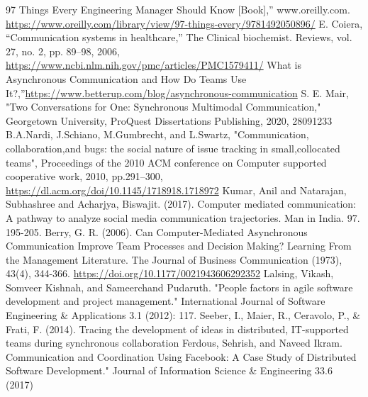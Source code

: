\documentclass[runningheads]{llncs}
\begin{document}
    \begin{thebibliography}{8}
        97 Things Every Engineering Manager Should Know [Book],” www.oreilly.com. \url{https://www.oreilly.com/library/view/97-things-every/9781492050896/}
        E. Coiera, “Communication systems in healthcare,” The Clinical biochemist. Reviews, vol. 27, no. 2, pp. 89–98, 2006, \url{https://www.ncbi.nlm.nih.gov/pmc/articles/PMC1579411/} 
        What is Asynchronous Communication and How Do Teams Use It?,”\url{https://www.betterup.com/blog/asynchronous-communication}
        S. E. Mair, "Two Conversations for One: Synchronous Multimodal Communication," Georgetown University, ProQuest Dissertations Publishing, 2020, 28091233
        B.A.Nardi, J.Schiano, M.Gumbrecht, and L.Swartz, "Communication, collaboration,and bugs: the social nature of issue tracking in small,collocated teams", Proceedings of the 2010 ACM conference on Computer supported cooperative work, 2010, pp.291–300, \url{https://dl.acm.org/doi/10.1145/1718918.1718972}
        Kumar, Anil and Natarajan, Subhashree and Acharjya, Biswajit. (2017). Computer mediated communication: A pathway to analyze social media communication trajectories. Man in India. 97. 195-205.
        Berry, G. R. (2006). Can Computer-Mediated Asynchronous Communication Improve Team Processes and Decision Making? Learning From the Management Literature. The Journal of Business Communication (1973), 43(4), 344-366. \url{https://doi.org/10.1177/0021943606292352}
        Lalsing, Vikash, Somveer Kishnah, and Sameerchand Pudaruth. "People factors in agile software development and project management." International Journal of Software Engineering \& Applications 3.1 (2012): 117.
        Seeber, I., Maier, R., Ceravolo, P., \& Frati, F. (2014). Tracing the development of ideas in distributed, IT-supported teams during synchronous collaboration
        Ferdous, Sehrish, and Naveed Ikram. Communication and Coordination Using Facebook: A Case Study of Distributed Software Development." Journal of Information Science \& Engineering 33.6 (2017)
    \end{thebibliography}
    
\end{document}
